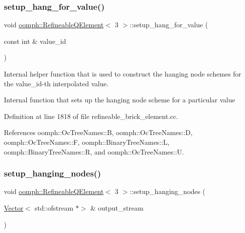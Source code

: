 \subsubsection{\texorpdfstring{setup\+\_\+hang\+\_\+for\+\_\+value()}{setup\_hang\_for\_value()}}
{\footnotesize\ttfamily void \hyperlink{classoomph_1_1RefineableQElement}{oomph\+::\+Refineable\+Q\+Element}$<$ 3 $>$\+::setup\+\_\+hang\+\_\+for\+\_\+value (\begin{DoxyParamCaption}\item[{const int \&}]{value\+\_\+id }\end{DoxyParamCaption})\hspace{0.3cm}{\ttfamily [protected]}}



Internal helper function that is used to construct the hanging node schemes for the value\+\_\+id-\/th interpolated value. 

Internal function that sets up the hanging node scheme for a particular value 

Definition at line 1818 of file refineable\+\_\+brick\+\_\+element.\+cc.



References oomph\+::\+Oc\+Tree\+Names\+::B, oomph\+::\+Oc\+Tree\+Names\+::D, oomph\+::\+Oc\+Tree\+Names\+::F, oomph\+::\+Binary\+Tree\+Names\+::L, oomph\+::\+Binary\+Tree\+Names\+::R, and oomph\+::\+Oc\+Tree\+Names\+::U.

\mbox{\label{classoomph_1_1RefineableQElement_3_013_01_4_aceb41f87bfce0e333ee0a713e382075f}} 
\subsubsection{\texorpdfstring{setup\+\_\+hanging\+\_\+nodes()}{setup\_hanging\_nodes()}}
{\footnotesize\ttfamily void \hyperlink{classoomph_1_1RefineableQElement}{oomph\+::\+Refineable\+Q\+Element}$<$ 3 $>$\+::setup\+\_\+hanging\+\_\+nodes (\begin{DoxyParamCaption}\item[{\hyperlink{classoomph_1_1Vector}{Vector}$<$ std\+::ofstream $\ast$$>$ \&}]{output\+\_\+stream }\end{DoxyParamCaption})\hspace{0.3cm}{\ttfamily [virtual]}}



